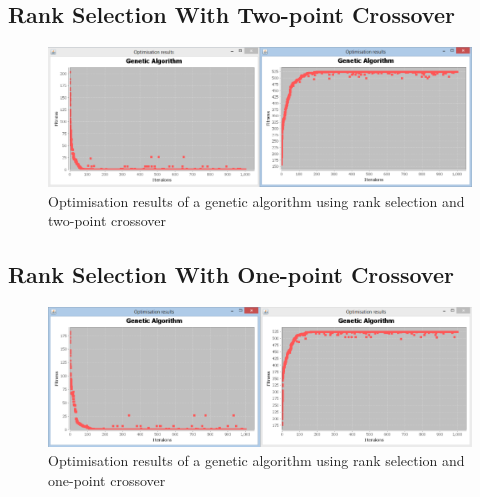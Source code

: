 \begin{landscape}
\subsection{Rank Selection With Two-point Crossover}
\label{sec:appendix5}
  \begin{figure}[h]
    \begin{center}
      \includegraphics{Figures/ga_rp_2p}
    \end{center}
    \caption{Optimisation results of a genetic algorithm using rank selection and two-point crossover}
    \label{fig:phase1}
  \end{figure}
\end{landscape}

\begin{landscape}
\subsection{Rank Selection With One-point Crossover}
\label{sec:appendix6}
  \begin{figure}[h]
    \begin{center}
      \includegraphics{Figures/ga_rp_1p}
    \end{center}
    \caption{Optimisation results of a genetic algorithm using rank selection and one-point crossover}
    \label{fig:phase1}
  \end{figure}
\end{landscape}

